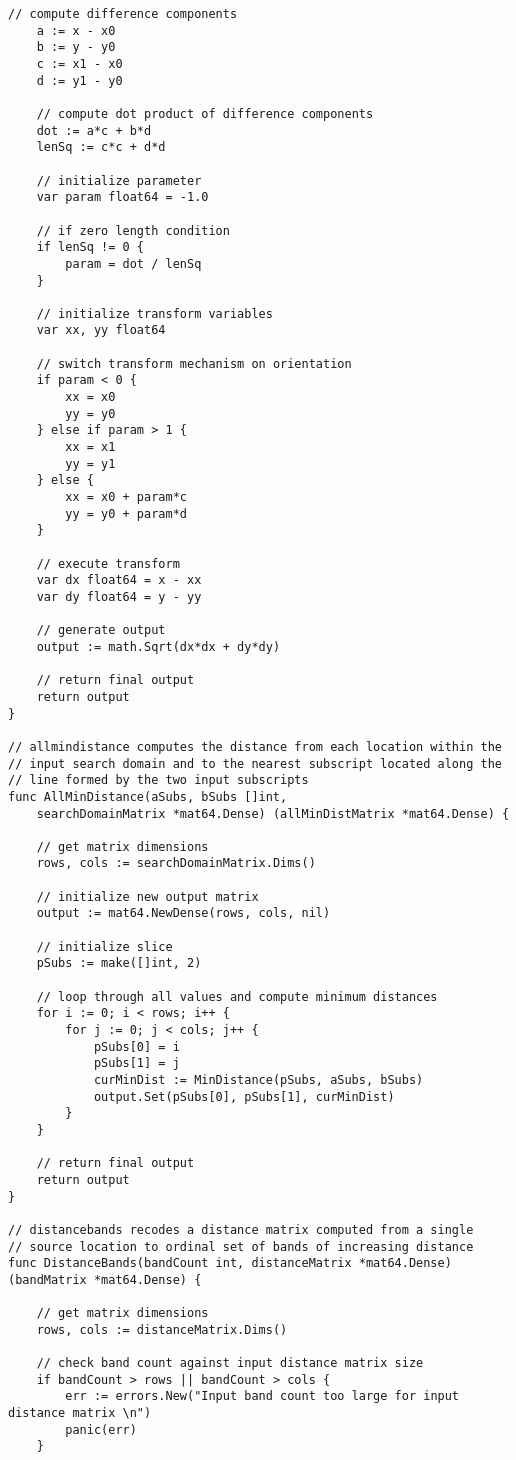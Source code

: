 \begin{lstlisting}[basicstyle=\tiny]
	// compute difference components
	a := x - x0
	b := y - y0
	c := x1 - x0
	d := y1 - y0

	// compute dot product of difference components
	dot := a*c + b*d
	lenSq := c*c + d*d

	// initialize parameter
	var param float64 = -1.0

	// if zero length condition
	if lenSq != 0 {
		param = dot / lenSq
	}

	// initialize transform variables
	var xx, yy float64

	// switch transform mechanism on orientation
	if param < 0 {
		xx = x0
		yy = y0
	} else if param > 1 {
		xx = x1
		yy = y1
	} else {
		xx = x0 + param*c
		yy = y0 + param*d
	}

	// execute transform
	var dx float64 = x - xx
	var dy float64 = y - yy

	// generate output
	output := math.Sqrt(dx*dx + dy*dy)

	// return final output
	return output
}

// allmindistance computes the distance from each location within the
// input search domain and to the nearest subscript located along the
// line formed by the two input subscripts
func AllMinDistance(aSubs, bSubs []int, 
    searchDomainMatrix *mat64.Dense) (allMinDistMatrix *mat64.Dense) {

	// get matrix dimensions
	rows, cols := searchDomainMatrix.Dims()

	// initialize new output matrix
	output := mat64.NewDense(rows, cols, nil)

	// initialize slice
	pSubs := make([]int, 2)

	// loop through all values and compute minimum distances
	for i := 0; i < rows; i++ {
		for j := 0; j < cols; j++ {
			pSubs[0] = i
			pSubs[1] = j
			curMinDist := MinDistance(pSubs, aSubs, bSubs)
			output.Set(pSubs[0], pSubs[1], curMinDist)
		}
	}

	// return final output
	return output
}

// distancebands recodes a distance matrix computed from a single
// source location to ordinal set of bands of increasing distance
func DistanceBands(bandCount int, distanceMatrix *mat64.Dense) (bandMatrix *mat64.Dense) {

	// get matrix dimensions
	rows, cols := distanceMatrix.Dims()

	// check band count against input distance matrix size
	if bandCount > rows || bandCount > cols {
		err := errors.New("Input band count too large for input distance matrix \n")
		panic(err)
	}


\end{lstlisting}
